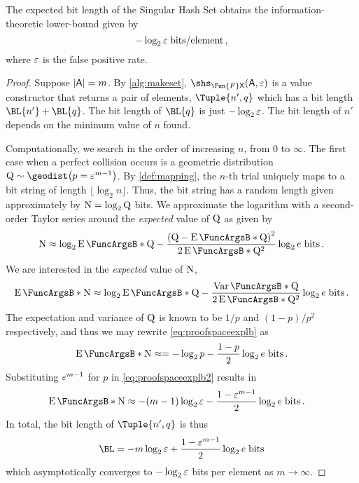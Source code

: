 \documentclass[ ../main.tex]{subfiles}
\begin{document}
\begin{theorem}
The expected bit length of the Singular Hash Set obtains the information-theoretic lower-bound given by
\begin{equation}
    -\log_2 \fprate \; \si{bits \per element}\,,
\end{equation}
where $\fprate$ is the false positive rate.
\end{theorem}
\begin{proof}
Suppose $\Card{\Set{A}}=m$.
By \cref{alg:makeset}, $\shs_{\Fun{F} \Set{X}}(\Set{A},\fprate)$ is a value constructor that returns a pair of elements, $\Tuple{n',q}$ which has a bit length $\BL{n'} + \BL{q}$.
The bit length of $\BL{q}$ is just $-\log_2 \fprate$.
The bit length of $n'$ depends on the minimum value of $n$ found.

Computationally, we search in the order of increasing $n$, from $0$ to $\infty$.
The first case when a perfect collision occurs is a geometric distribution $\RV{Q} \sim \geodist \!\left(p = \fprate^{m-1}\right)$.
By \cref{def:mapping}, the $n$-th trial uniquely maps to a bit string of length $\lfloor \log_2 n \rfloor$.
Thus, the bit string has a random length given approximately by $\RV{N} = \log_2 \RV{Q}$ bits.
We approximate the logarithm with a second-order Taylor series around the \emph{expected} value of $\RV{Q}$ as given by
\begin{equation}
    \RV{N} \approx
        \log_2 \Expect{\RV{Q}} -
        \frac{\left(\RV{Q} - \Expect{\RV{Q}}\right)^2}{2 \Expect{\RV{Q}}^2}        
        \log_2 e\; \si{bits}\,.
\end{equation}
We are interested in the \emph{expected} value of $\RV{N}$,
\begin{equation}
\label{eq:proofspaceexplb}
    \Expect{\RV{N}} \approx
        \log_2 \Expect{\RV{Q}} -
        \frac{\Var{\RV{Q}}}{2 \Expect{\RV{Q}}^2} \log_2 e \; \si{bits}\,.
\end{equation}
The expectation and variance of $\RV{Q}$ is known to be $1/p$ and $(1-p)/p^2$ respectively, and thus we may rewrite \cref{eq:proofspaceexplb} as
\begin{equation}
\label{eq:proofspaceexplb2}
	\Expect{\RV{N}} \approx = -\log_2 p - \frac{1-p}{2} \log_2 e \; \si{bits}\,.
\end{equation} 
Substituting $\fprate^{m-1}$ for $p$ in \cref{eq:proofspaceexplb2} results in
\begin{align}
    \Expect{\RV{N}}
        &\approx -(m-1) \log_2 \fprate - \frac{1-\fprate^{m-1}}{2} \log_2 e \; \si{bits}\,.
\end{align}
In total, the bit length of $\Tuple{n',q}$ is thus
\begin{equation}
	\BL = -m \log_2 \fprate +  \frac{1-\fprate^{m-1}}{2} \log_2 e \; \si{bits}
\end{equation}
which asymptotically converges to $-\log_2 \fprate$ bits per element as $m \to \infty$.
\end{proof}
\end{document}
